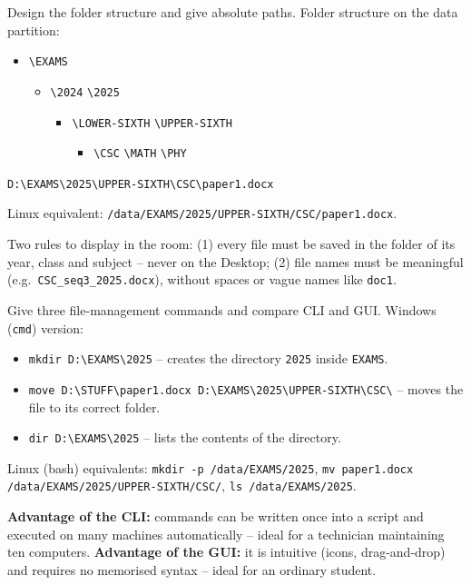 \documentclass[11pt]{article}
\begin{document}
\begin{exoresolu}
Design the folder structure and give absolute paths.
\tcblower
Folder structure on the data partition:
\begin{itemize}
\item[\texttt{D:}] \texttt{\textbackslash EXAMS}
\begin{itemize}
\item \texttt{\textbackslash 2024} \quad \texttt{\textbackslash 2025}
\begin{itemize}
\item \texttt{\textbackslash LOWER-SIXTH} \quad \texttt{\textbackslash UPPER-SIXTH}
\begin{itemize}
\item \texttt{\textbackslash CSC} \quad \texttt{\textbackslash MATH} \quad \texttt{\textbackslash PHY}
\end{itemize}
\end{itemize}
\end{itemize}
\end{itemize}

\begin{center}
\texttt{D:\textbackslash EXAMS\textbackslash 2025\textbackslash UPPER-SIXTH\textbackslash CSC\textbackslash paper1.docx}
\end{center}
Linux equivalent: \texttt{/data/EXAMS/2025/UPPER-SIXTH/CSC/paper1.docx}.

Two rules to display in the room: (1) every file must be saved in the folder of its year, class and subject -- never on the Desktop; (2) file names must be meaningful (e.g.\ \texttt{CSC\_seq3\_2025.docx}), without spaces or vague names like \texttt{doc1}.
\end{exoresolu}

\begin{exoresolu}
Give three file-management commands and compare CLI and GUI.
\tcblower
Windows (\texttt{cmd}) version:
\begin{itemize}
\item \texttt{mkdir D:\textbackslash EXAMS\textbackslash 2025} -- creates the directory \texttt{2025} inside \texttt{EXAMS}.
\item \texttt{move D:\textbackslash STUFF\textbackslash paper1.docx D:\textbackslash EXAMS\textbackslash 2025\textbackslash UPPER-SIXTH\textbackslash CSC\textbackslash} -- moves the file to its correct folder.
\item \texttt{dir D:\textbackslash EXAMS\textbackslash 2025} -- lists the contents of the directory.
\end{itemize}
Linux (bash) equivalents: \texttt{mkdir -p /data/EXAMS/2025}, \texttt{mv paper1.docx /data/EXAMS/2025/UPPER-SIXTH/CSC/}, \texttt{ls /data/EXAMS/2025}.

\textbf{Advantage of the CLI:} commands can be written once into a script and executed on many machines automatically -- ideal for a technician maintaining ten computers. \textbf{Advantage of the GUI:} it is intuitive (icons, drag-and-drop) and requires no memorised syntax -- ideal for an ordinary student.
\end{exoresolu}
\end{document}
